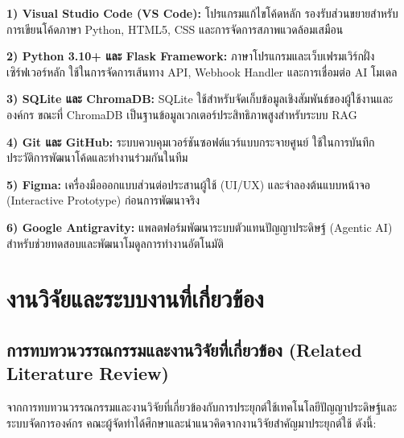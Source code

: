 \noindent\hspace*{1.3em}\textbf{1) Visual Studio Code (VS Code):} โปรแกรมแก้ไขโค้ดหลัก รองรับส่วนขยายสำหรับการเขียนโค้ดภาษา Python, HTML5, CSS และการจัดการสภาพแวดล้อมเสมือน\par\vspace{0.25em}
\noindent\hspace*{1.3em}\textbf{2) Python 3.10+ และ Flask Framework:} ภาษาโปรแกรมและเว็บเฟรมเวิร์กฝั่งเซิร์ฟเวอร์หลัก ใช้ในการจัดการเส้นทาง API, Webhook Handler และการเชื่อมต่อ AI โมเดล\par\vspace{0.25em}
\noindent\hspace*{1.3em}\textbf{3) SQLite และ ChromaDB:} SQLite ใช้สำหรับจัดเก็บข้อมูลเชิงสัมพันธ์ของผู้ใช้งานและองค์กร ขณะที่ ChromaDB เป็นฐานข้อมูลเวกเตอร์ประสิทธิภาพสูงสำหรับระบบ RAG\par\vspace{0.25em}
\noindent\hspace*{1.3em}\textbf{4) Git และ GitHub:} ระบบควบคุมเวอร์ชันซอฟต์แวร์แบบกระจายศูนย์ ใช้ในการบันทึกประวัติการพัฒนาโค้ดและทำงานร่วมกันในทีม\par\vspace{0.25em}
\noindent\hspace*{1.3em}\textbf{5) Figma:} เครื่องมือออกแบบส่วนต่อประสานผู้ใช้ (UI/UX) และจำลองต้นแบบหน้าจอ (Interactive Prototype) ก่อนการพัฒนาจริง\par\vspace{0.25em}
\noindent\hspace*{1.3em}\textbf{6) Google Antigravity:} แพลตฟอร์มพัฒนาระบบตัวแทนปัญญาประดิษฐ์ (Agentic AI) สำหรับช่วยทดสอบและพัฒนาโมดูลการทำงานอัตโนมัติ\par\vspace{0.4em}

\section{งานวิจัยและระบบงานที่เกี่ยวข้อง}

\subsection{การทบทวนวรรณกรรมและงานวิจัยที่เกี่ยวข้อง (Related Literature Review)}
\hspace*{1.3em}
จากการทบทวนวรรณกรรมและงานวิจัยที่เกี่ยวข้องกับการประยุกต์ใช้เทคโนโลยีปัญญาประดิษฐ์และระบบจัดการองค์กร คณะผู้จัดทำได้ศึกษาและนำแนวคิดจากงานวิจัยสำคัญมาประยุกต์ใช้ ดังนี้:

